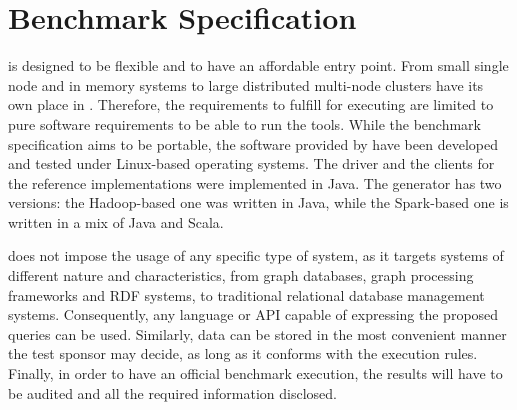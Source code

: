 \chapter{Benchmark Specification}
\label{sec:benchmark-specification}

\ldbcsnb is designed to be flexible and to have an affordable entry point. From small single node and in memory systems to large distributed multi-node clusters have its own place in \ldbcsnb. Therefore, the requirements to fulfill for executing \ldbcsnb are limited to pure software requirements to be able to run the tools. While the benchmark specification aims to be portable, the software provided by \ldbcsnb have been developed and tested under Linux-based operating systems. The driver and the clients for the reference implementations were implemented in Java. The generator has two versions: the Hadoop-based one was written in Java, while the Spark-based one is written in a mix of Java and Scala.

\ldbcsnb does not impose the usage of any specific type of system, as it targets systems of different nature and characteristics, from graph databases, graph processing frameworks and RDF systems, to traditional relational database management systems. Consequently, any language or API capable of expressing the proposed queries can be used. Similarly, data can be stored in the most convenient manner the test sponsor may decide, as long as it conforms with the execution rules. Finally, in order to have an official benchmark execution, the results will have to be audited and all the required information disclosed.
